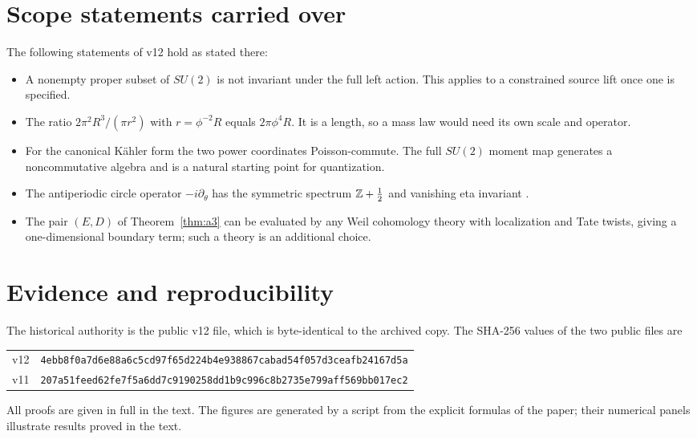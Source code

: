 \documentclass[11pt]{article}
\theoremstyle{definition}\newtheorem{definition}[theorem]{Definition}
\theoremstyle{remark}\newtheorem{remark}[theorem]{Remark}
\begin{document}
\section{Scope statements carried over}\label{sec:limits}
The following statements of v12 hold as stated there:
\begin{itemize}
\item A nonempty proper subset of $SU(2)$ is not invariant under the full left
action. This applies to a constrained source lift once one is specified.
\item The ratio $2\pi^2R^3/(\pi r^2)$ with $r=\phi^{-2}R$ equals $2\pi\phi^4R$.
It is a length, so a mass law would need its own scale and operator.
\item For the canonical Kähler form the two power coordinates Poisson-commute.
The full $SU(2)$ moment map generates a noncommutative algebra and is a natural
starting point for quantization.
\item The antiperiodic circle operator $-i\partial_\theta$ has the symmetric
spectrum $\mathbb Z+\frac12$ and vanishing eta invariant \cite{aps}.
\item The pair $(E,D)$ of Theorem~\ref{thm:a3} can be evaluated by any Weil
cohomology theory with localization and Tate twists, giving a one-dimensional
boundary term; such a theory is an additional choice.
\end{itemize}

\section{Evidence and reproducibility}\label{app:evidence}
The historical authority is the public v12 file, which is byte-identical to
the archived copy. The SHA-256 values of the two public files are
\begin{center}\footnotesize
\begin{tabular}{@{}ll@{}}
v12 & \texttt{4ebb8f0a7d6e88a6c5cd97f65d224b4e938867cabad54f057d3ceafb24167d5a}\\
v11 & \texttt{207a51feed62fe7f5a6dd7c9190258dd1b9c996c8b2735e799aff569bb017ec2}
\end{tabular}
\end{center}

All proofs are given in full in the text. The figures are generated by a
script from the explicit formulas of the paper; their numerical panels
illustrate results proved in the text.
\end{document}

